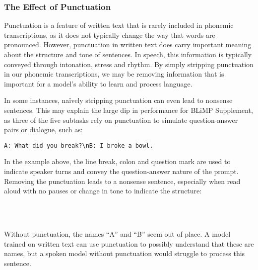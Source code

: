 \subsubsection{The Effect of Punctuation}
\label{sec:punctuation}

Punctuation is a feature of written text that is rarely included in phonemic transcriptions, as it does not typically change the way that words are pronounced. However, punctuation in written text does carry important meaning about the structure and tone of sentences. In speech, this information is typically conveyed through intonation, stress and rhythm. By simply stripping punctuation in our phonemic transcriptions, we may be removing information that is important for a model's ability to learn and process language. 

In some instances, na\"ively stripping punctuation can even lead to nonsense sentences. This may explain the large dip in performance for BLiMP Supplement, as three of the five subtasks rely on punctuation to simulate question-answer pairs or dialogue, such as:

\vspace{-1mm}
\begin{center}
\begin{verbatim}
A: What did you break?\nB: I broke a bowl.
\end{verbatim}
\end{center}
\vspace{-1mm}

In the example above, the line break, colon and question mark are used to indicate speaker turns and convey the question-answer nature of the prompt. Removing the punctuation leads to a nonsense sentence, especially when read aloud with no pauses or change in tone to indicate the structure:

\vspace{-1mm}
\begin{center}
~\textvisiblespace~~\textvisiblespace~~\textvisiblespace~~\textvisiblespace~~~~\textvisiblespace~~\textvisiblespace~~\textvisiblespace\\~\textvisiblespace~~\textvisiblespace~~\textvisiblespace
\end{center}
\vspace{-1mm}

Without punctuation, the names ``A'' and ``B'' seem out of place. A model trained on written text can use punctuation to possibly understand that these are names, but a spoken model without punctuation would struggle to process this sentence.

